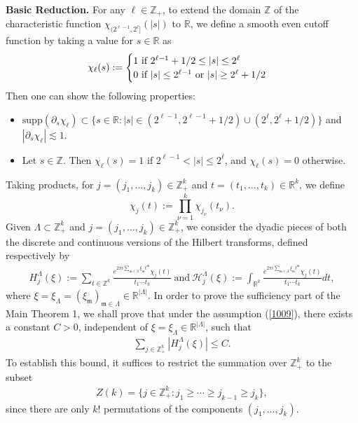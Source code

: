 \documentclass[10pt,a4paper]{amsart}
\numberwithin{equation}{section}
\begin{document}
 \noindent
{\bf Basic Reduction.} For any $\ell\in \mathbb{Z}_{+}$, to  extend the domain $\mathbb{Z}$ of the characteristic function   $\chi_{(2^{\ell-1},2^{\ell}]}(|s|)$   to $\mathbb{R}$,  we
define a smooth even cutoff function   by taking a value for $s\in \mathbb{R}$ as
\begin{align}\label{aria}
	\chi_\ell(s):=\begin{cases} 1\ \text{if $2^{\ell-1}+1/2 \le |s|\le 2^{\ell}$}\\
		0 \ \text{if $|s|\le  2^{\ell-1}$ or $ |s|\ge 2^{\ell}+1/2$}
	\end{cases} 
\end{align}
Then one can show the following properties:
\begin{itemize}
	\item[(1)] $\text{supp}(\partial_s\chi_{\ell})\subset \{s\in \mathbb{R}:|s|\in (2^{\ell-1},2^{\ell-1}+1/2)\cup (2^{\ell},2^{\ell}+1/2)\}$ and $|\partial_s\chi_{\ell}|\lesssim 1$. 
	\item[(2)]  Let $s\in \mathbb{Z}$. Then
	$\chi_\ell(s)=1$  if $2^{\ell-1}< |s|\le 2^{\ell} $, and $\chi_\ell(s)=0$ otherwise.
\end{itemize}
Taking products, for
$j=(j_1,\ldots,j_k)\in\mathbb Z_+^k$ and
$t=(t_1,\ldots,t_k)\in\mathbb R^k$, we define
\[
\chi_j(t):=\prod_{\nu=1}^k\chi_{j_\nu}(t_\nu).
\]
Given $\Lambda \subset \mathbb{Z}_+^k$ and $j= (j_1, \ldots, j_k) \in \mathbb{Z}_+^k$, we consider the dyadic pieces of both the discrete and continuous versions of the Hilbert transforms, defined respectively by
\begin{align*}
	H^{\Lambda}_j(\xi):= \sum_{t\in \mathbb{Z}^k}  \frac{e^{2\pi i \sum_{\mathfrak{m}\in\Lambda} \xi_{\mathfrak{m}} t^{\mathfrak{m}}}\chi_j(t)}{t_1\cdots t_k}\  \text{and}\  \mathcal{H}^{\Lambda}_j(\xi):= \int_{\mathbb{R}^k} \frac{e^{2\pi i \sum_{\mathfrak{m}\in\Lambda} \xi_{\mathfrak{m}} t^{\mathfrak{m}}}\chi_j(t)}{t_1\cdots t_k}dt,
\end{align*}
where $\xi=\xi_{\Lambda}=(\xi_{\mathfrak{m}})_{\mathfrak{m}\in \Lambda}\in \mathbb{R}^{|\Lambda|}$.  In order to prove the sufficiency part of the Main Theorem 1, we shall prove that under the assumption (\ref{1009}), there exists a constant $C > 0$, independent of $\xi=\xi_{\Lambda}\in \mathbb{R}^{|\Lambda|}$, such that
\begin{align}\label{se11}
\sum_{j\in \mathbb{Z}_+^k} |H_j^{\Lambda}(\xi)| \le C.
\end{align}
To establish this bound, it suffices to restrict the summation over $\mathbb{Z}_+^k$ to the subset
 \begin{align}
Z(k)=\{j\in \mathbb{Z}_{+}^{k}: j_1\ge \cdots \ge j_{k-1}\ge j_k\},\label{joor}
\end{align} 
since there are only $k!$ permutations of the components $(j_1, \ldots, j_k)$. 
\end{document}
